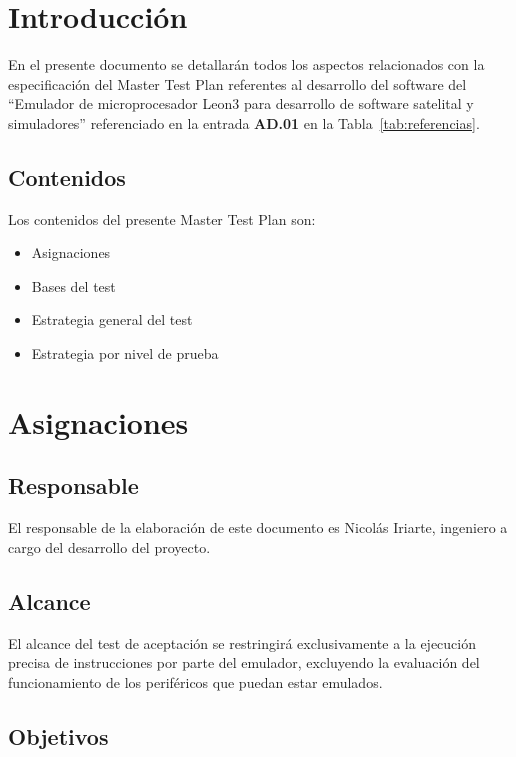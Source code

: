 \documentclass[
  11pt, %
  codirector, %
]{charter}
\begin{document}
\pagebreak


\section{Introducción}
\label{sec:org60390fa}

En el presente documento se detallarán todos los aspectos relacionados con la especificación del Master Test Plan referentes al desarrollo del software del ``Emulador de microprocesador Leon3 para desarrollo de software satelital y simuladores'' referenciado en la entrada \textbf{AD.01} en la Tabla~\ref{tab:referencias}.


\subsection{Contenidos}
\label{sec:org434c3ef}

Los contenidos del presente Master Test Plan son:

\begin{itemize}
\item Asignaciones
\item Bases del test
\item Estrategia general del test
\item Estrategia por nivel de prueba
\end{itemize}

\section{Asignaciones}
\label{sec:orgc1c4017}

\subsection{Responsable}
\label{sec:orgdaca22c}

El responsable de la elaboración de este documento es Nicolás Iriarte, ingeniero a cargo del desarrollo del proyecto.

\subsection{Alcance}
\label{sec:orgaf51da6}

El alcance del test de aceptación se restringirá exclusivamente a la ejecución precisa de instrucciones por parte del emulador, excluyendo la evaluación del funcionamiento de los periféricos que puedan estar emulados.

\subsection{Objetivos}
\label{sec:orga40b0ee}
\end{document}
